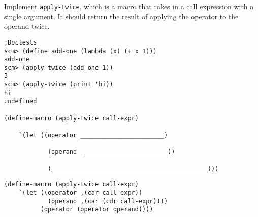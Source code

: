 \begin{blocksection}

\question Implement \texttt{apply-twice}, which is a macro that takes in a call expression with
a single argument. It should return the result of applying the operator to the operand twice.

\begin{lstlisting}
;Doctests
scm> (define add-one (lambda (x) (+ x 1)))
add-one
scm> (apply-twice (add-one 1))
3
scm> (apply-twice (print 'hi)) 
hi
undefined

(define-macro (apply-twice call-expr)
    
    `(let ((operator _______________________)

            (operand  _______________________))
            
            (___________________________________________)))
\end{lstlisting}

\begin{solution}[0.5in]
\begin{lstlisting}
(define-macro (apply-twice call-expr)
    `(let ((operator ,(car call-expr))
            (operand ,(car (cdr call-expr))))
          (operator (operator operand))))
\end{lstlisting}
\end{solution}

\end{blocksection}